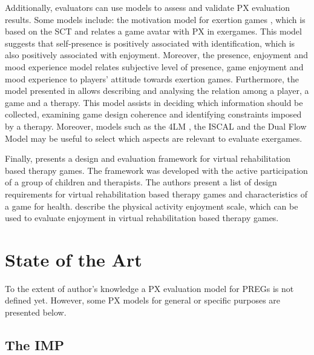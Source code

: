 Additionally, evaluators can use models to assess and validate PX evaluation results. Some models include: the motivation model for exertion games \autocite{Li2016}, which is based on the \ac{SCT} and relates a game avatar with \ac{PX} in exergames. This model suggests that self-presence is positively associated with identification, which is also positively associated with enjoyment. Moreover, the presence, enjoyment and mood experience model \autocite{Ho2017} relates subjective level of presence, game enjoyment and mood experience to players' attitude towards exertion games. Furthermore, the model presented in \autocite{Mader2012} allows describing and analysing the relation among a player, a game and a therapy. This model assists in deciding which information should be collected, examining game design coherence and identifying constraints imposed by a therapy. Moreover, models such as the \ac{4LM} \autocite{Mueller2011}, the \ac{ISCAL} \autocite{Zhang2011} and the Dual Flow Model \autocite{Sinclair2007} may be useful to select which aspects are relevant to evaluate exergames.

Finally, \textcite{Ni2014} presents a design and evaluation framework for virtual rehabilitation based therapy games. The framework was developed with the active participation of a group of children and therapists. The authors present a list of design requirements for virtual rehabilitation based therapy games and characteristics of a game for health. \textcite{kendzierski1991physical} describe the physical activity enjoyment scale, which can be used to evaluate enjoyment in virtual rehabilitation based therapy games.


\section{State of the Art}
\label{sec:px_ux_models}

To the extent of author's knowledge a \ac{PX} evaluation model for \acp{PREG} is not defined yet. However, some \ac{PX} models for general or specific purposes are presented below.

\subsection{The \ac{IMP}} 

